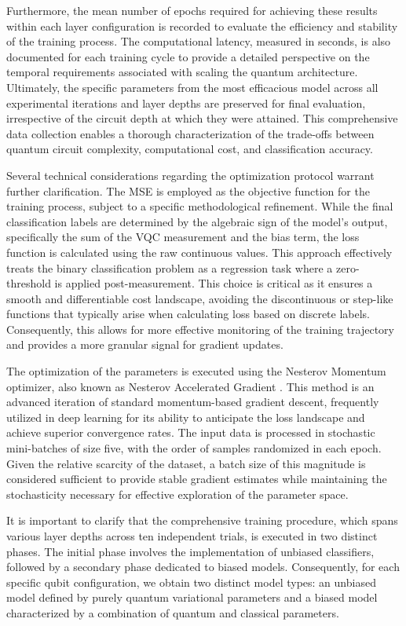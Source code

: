 \documentclass[en]{dimscthesis}
\begin{document}
Furthermore, the mean number of epochs required for achieving these results within each layer configuration is recorded to evaluate the efficiency and stability of the training process. The computational latency, measured in seconds, is also documented for each training cycle to provide a detailed perspective on the temporal requirements associated with scaling the quantum architecture. Ultimately, the specific parameters from the most efficacious model across all experimental iterations and layer depths are preserved for final evaluation, irrespective of the circuit depth at which they were attained. This comprehensive data collection enables a thorough characterization of the trade-offs between quantum circuit complexity, computational cost, and classification accuracy.

Several technical considerations regarding the optimization protocol warrant further clarification. The MSE is employed as the objective function for the training process, subject to a specific methodological refinement. While the final classification labels are determined by the algebraic sign of the model's output, specifically the sum of the VQC measurement and the bias term, the loss function is calculated using the raw continuous values. This approach effectively treats the binary classification problem as a regression task where a zero-threshold is applied post-measurement. This choice is critical as it ensures a smooth and differentiable cost landscape, avoiding the discontinuous or step-like functions that typically arise when calculating loss based on discrete labels. Consequently, this allows for more effective monitoring of the training trajectory and provides a more granular signal for gradient updates.

The optimization of the parameters is executed using the Nesterov Momentum optimizer, also known as Nesterov Accelerated Gradient \cite{bib:nesterov}. This method is an advanced iteration of standard momentum-based gradient descent, frequently utilized in deep learning for its ability to anticipate the loss landscape and achieve superior convergence rates. The input data is processed in stochastic mini-batches of size five, with the order of samples randomized in each epoch. Given the relative scarcity of the dataset, a batch size of this magnitude is considered sufficient to provide stable gradient estimates while maintaining the stochasticity necessary for effective exploration of the parameter space.

It is important to clarify that the comprehensive training procedure, which spans various layer depths across ten independent trials, is executed in two distinct phases. The initial phase involves the implementation of unbiased classifiers, followed by a secondary phase dedicated to biased models. Consequently, for each specific qubit configuration, we obtain two distinct model types: an unbiased model defined by purely quantum variational parameters and a biased model characterized by a combination of quantum and classical parameters.
\end{document}
